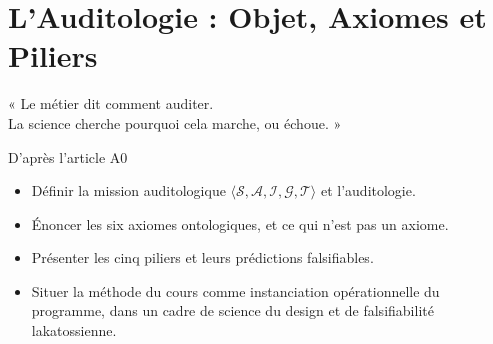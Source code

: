 
\chapter{L'Auditologie : Objet, Axiomes et Piliers}
\label{chap:auditologie}

\epigraph{%
    « Le métier dit comment auditer.\\
    La science cherche pourquoi cela marche, ou échoue. »%
}{D'après l'article A0}


\begin{boxobjectifs}
\begin{itemize}
    \item Définir la mission auditologique
          $\langle \mathcal{S}, \mathcal{A}, \mathcal{I}, \mathcal{G},
          \mathcal{T} \rangle$ et l'auditologie.
    \item Énoncer les six axiomes ontologiques, et ce qui n'est pas un
          axiome.
    \item Présenter les cinq piliers et leurs prédictions falsifiables.
    \item Situer la méthode du cours comme instanciation opérationnelle du
          programme, dans un cadre de science du design et de
          falsifiabilité lakatossienne.
\end{itemize}
\end{boxobjectifs}

